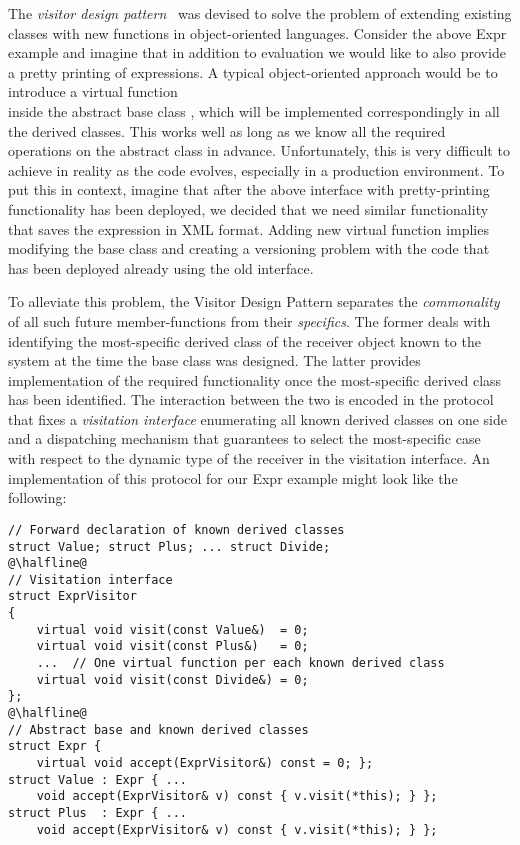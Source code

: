 The \emph{visitor design pattern}~\cite{DesignPatterns1993} was devised to solve the problem 
of extending existing classes with new functions in object-oriented languages. 
Consider the above Expr example and imagine that in addition to evaluation we would like to also provide a pretty 
printing of expressions. A typical object-oriented approach would be to 
introduce a virtual function \\  inside 
the abstract base class , which will be implemented correspondingly 
in all the derived classes. This works well as long as we know all the required  
operations on the abstract class in advance. Unfortunately, this is very 
difficult to achieve in reality as the code evolves, especially in a production 
environment. To put this in context, imagine that after the above interface with 
pretty-printing functionality has been deployed, we decided that we need 
similar functionality that saves the expression in XML format. Adding new 
virtual function implies modifying the base class and creating a versioning 
problem with the code that has been deployed already using the old interface.

To alleviate this problem, the Visitor Design Pattern separates the 
\emph{commonality} of all such future member-functions from their 
\emph{specifics}. The former deals with identifying the most-specific derived 
class of the receiver object known to the system at the time the base class was 
designed. The latter provides implementation of the required functionality once 
the most-specific derived class has been identified. The interaction between the 
two is encoded in the protocol that fixes a \emph{visitation interface} 
enumerating all known derived classes on one side and a dispatching mechanism 
that guarantees to select the most-specific case with respect to the dynamic 
type of the receiver in the visitation interface. An implementation of this 
protocol for our Expr example might look like the following:

\begin{lstlisting}
// Forward declaration of known derived classes
struct Value; struct Plus; ... struct Divide;
@\halfline@
// Visitation interface
struct ExprVisitor
{
    virtual void visit(const Value&)  = 0;
    virtual void visit(const Plus&)   = 0;
    ...  // One virtual function per each known derived class
    virtual void visit(const Divide&) = 0;
};
@\halfline@
// Abstract base and known derived classes
struct Expr { 
    virtual void accept(ExprVisitor&) const = 0; };
struct Value : Expr { ...
    void accept(ExprVisitor& v) const { v.visit(*this); } };
struct Plus  : Expr { ...
    void accept(ExprVisitor& v) const { v.visit(*this); } };
\end{lstlisting}

